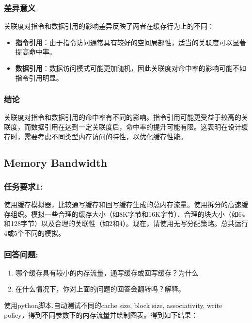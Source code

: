 \documentclass[12pt,hyperref,a4paper,UTF8]{ctexart}
\begin{document}
\subsubsection*{差异意义}
关联度对指令和数据引用的影响差异反映了两者在缓存行为上的不同：
\begin{itemize}
  \item \textbf{指令引用}：由于指令访问通常具有较好的空间局部性，适当的关联度可以显著提高命中率。
  \item \textbf{数据引用}：数据访问模式可能更加随机，因此关联度对命中率的影响可能不如指令引用明显。
\end{itemize}

\subsubsection*{结论}
关联度对指令和数据引用的命中率有不同的影响。指令引用可能更受益于较高的关联度，而数据引用在达到一定关联度后，命中率的提升可能有限。这表明在设计缓存时，需要考虑不同类型内存访问的特性，以优化缓存性能。

\newpage

\subsection*{Memory Bandwidth}

\subsubsection*{任务要求1:}
使用缓存模拟器，比较通写缓存和回写缓存生成的总内存流量。使用拆分的高速缓存组织。模拟一些合理的缓存大小（如8K字节和16K字节）、合理的块大小（如64和128字节）以及合理的关联性（如2和4）。现在，请使用无写分配策略。总共运行4或5个不同的模拟。

\subsubsection*{回答问题:}
\begin{enumerate}
    \item 哪个缓存具有较小的内存流量，通写缓存或回写缓存？为什么 
    \item 在什么情况下，你对上面的问题的回答会翻转吗？解释。
\end{enumerate}

使用python脚本,自动测试不同的cache size, block size, associativity, write policy，得到不同参数下的内存流量并绘制图表。得到如下结果：
\end{document}
